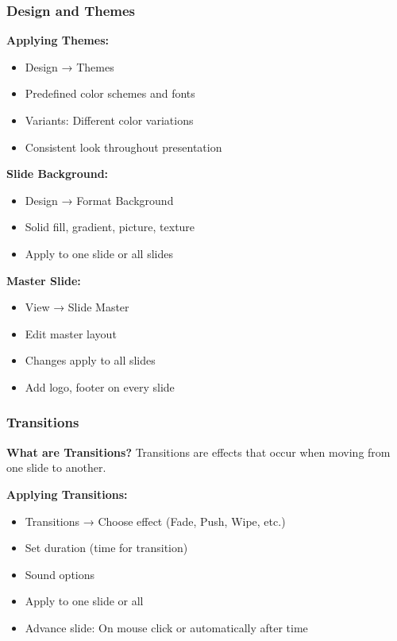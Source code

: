 \documentclass[12pt,a4paper]{article}
\begin{document}
\subsubsection{Design and Themes}

\textbf{Applying Themes:}
\begin{itemize}
    \item Design → Themes
    \item Predefined color schemes and fonts
    \item Variants: Different color variations
    \item Consistent look throughout presentation
\end{itemize}

\textbf{Slide Background:}
\begin{itemize}
    \item Design → Format Background
    \item Solid fill, gradient, picture, texture
    \item Apply to one slide or all slides
\end{itemize}

\textbf{Master Slide:}
\begin{itemize}
    \item View → Slide Master
    \item Edit master layout
    \item Changes apply to all slides
    \item Add logo, footer on every slide
\end{itemize}

\subsubsection{Transitions}

\textbf{What are Transitions?}
Transitions are effects that occur when moving from one slide to another.

\textbf{Applying Transitions:}
\begin{itemize}
    \item Transitions → Choose effect (Fade, Push, Wipe, etc.)
    \item Set duration (time for transition)
    \item Sound options
    \item Apply to one slide or all
    \item Advance slide: On mouse click or automatically after time
\end{itemize}
\end{document}
